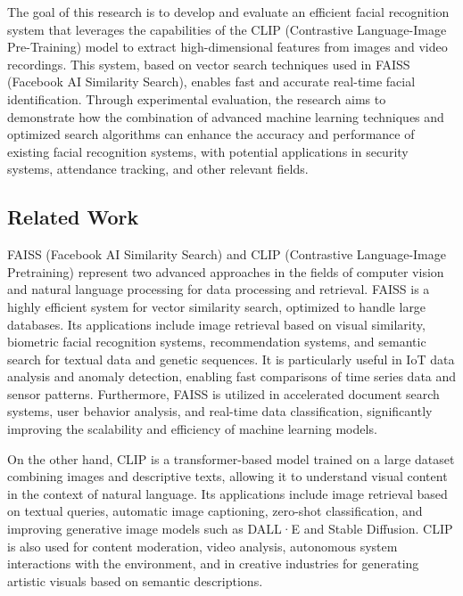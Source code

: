 \documentclass{article}
\begin{document}
\hspace*{1.00cm}The goal of this research is to develop and evaluate an efficient facial recognition system that leverages the capabilities of the CLIP (Contrastive Language-Image Pre-Training) model to extract high-dimensional features from images and video recordings. This system, based on vector search techniques used in FAISS (Facebook AI Similarity Search), enables fast and accurate real-time facial identification. Through experimental evaluation, the research aims to demonstrate how the combination of advanced machine learning techniques and optimized search algorithms can enhance the accuracy and performance of existing facial recognition systems, with potential applications in security systems, attendance tracking, and other relevant fields.


\subsection*{Related Work}

\hspace*{1.00cm}FAISS (Facebook AI Similarity Search)\cite{faiss2025} and CLIP (Contrastive Language-Image Pretraining)\cite{luu2024clip} represent two advanced approaches in the fields of computer vision and natural language processing for data processing and retrieval. FAISS is a highly efficient system for vector similarity search, optimized to handle large databases. Its applications include image retrieval based on visual similarity, biometric facial recognition systems, recommendation systems, and semantic search for textual data and genetic sequences. It is particularly useful in IoT data analysis and anomaly detection, enabling fast comparisons of time series data and sensor patterns. Furthermore, FAISS is utilized in accelerated document search systems, user behavior analysis, and real-time data classification, significantly improving the scalability and efficiency of machine learning models.

\hspace*{1.00cm}On the other hand, CLIP is a transformer-based model trained on a large dataset combining images and descriptive texts, allowing it to understand visual content in the context of natural language. Its applications include image retrieval based on textual queries, automatic image captioning, zero-shot classification, and improving generative image models such as DALL·E and Stable Diffusion. CLIP is also used for content moderation, video analysis, autonomous system interactions with the environment, and in creative industries for generating artistic visuals based on semantic descriptions.
\end{document}
